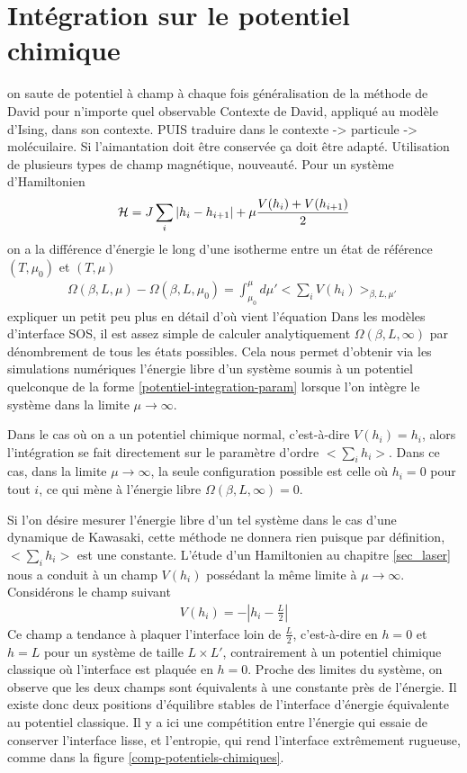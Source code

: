 \section{Intégration sur le potentiel chimique}
{\color{red} on saute de potentiel à champ à chaque fois
généralisation de la méthode de David pour n'importe quel observable
Contexte de David, appliqué au modèle d'Ising, dans son contexte.
PUIS traduire dans le contexte -> particule -> molécuilaire. 
 Si l'aimantation doit être conservée ça doit être adapté. Utilisation de plusieurs types de champ magnétique, nouveauté.}
Pour un système d'Hamiltonien 
\begin{align}
    \mathcal{H} = J \sum_i |h_i-h_{i+1}| + \mu \frac{V(h_i)+V(h_{i+1})}{2}
    \label{potentiel-integration-param}
\end{align}
on a la différence d'énergie le long d'une isotherme entre un état de référence $(T,\mu_0)$ et $(T,\mu)$ \cite{lopes_cardozo_critical_2014}
\begin{align}
   \Omega(\beta,L,\mu) - \Omega(\beta,L,\mu_0) = \int_{\mu_0}^\mu d\mu'  < \sum_i V(h_i) >_{\beta,L,\mu'} 
\end{align}
{\color{red} expliquer un petit peu plus en détail d'où vient l'équation}
Dans les modèles d'interface SOS, il est assez simple de calculer analytiquement $\Omega(\beta,L,\infty)$ par dénombrement de tous les états possibles. Cela nous permet d'obtenir via les simulations numériques l'énergie libre d'un système soumis à un potentiel quelconque de la forme \ref{potentiel-integration-param} lorsque l'on intègre le système dans la limite $\mu \to \infty$.

Dans le cas où on a un potentiel chimique normal, c'est-à-dire $V(h_i)= h_i$, alors l'intégration se fait directement sur le paramètre d'ordre $<\sum_i h_i>$. Dans ce cas, dans la limite $\mu \to \infty$, la seule configuration possible est celle où $h_i=0$ pour tout $i$, ce qui mène à l'énergie libre $\Omega(\beta,L,\infty) = 0$. 

Si l'on désire mesurer l'énergie libre d'un tel système dans le cas d'une dynamique de Kawasaki, cette méthode ne donnera rien puisque par définition, $<\sum_i h_i>$ est une constante. L'étude d'un Hamiltonien au chapitre \ref{sec_laser} nous a conduit à un champ $V(h_i)$ possédant la même limite à $\mu \to \infty$. Considérons le champ suivant
\begin{align}
    V(h_i) = - |h_i-\frac{L}{2}|
    \label{neggstaged}
\end{align}
Ce champ a tendance à plaquer l'interface loin de $\frac{L}{2}$, c'est-à-dire en $h=0$ et $h=L$ pour un système de taille $L\times L'$, contrairement à un potentiel chimique classique où l'interface est plaquée en $h=0$. Proche des limites du système, on observe que les deux champs sont équivalents à une constante près de l'énergie. Il existe donc deux positions d'équilibre stables de l'interface d'énergie équivalente au potentiel classique. Il y a ici une compétition entre l'énergie qui essaie de conserver l'interface lisse, et l'entropie, qui rend l'interface extrêmement rugueuse, comme dans la figure \ref{comp-potentiels-chimiques}.

